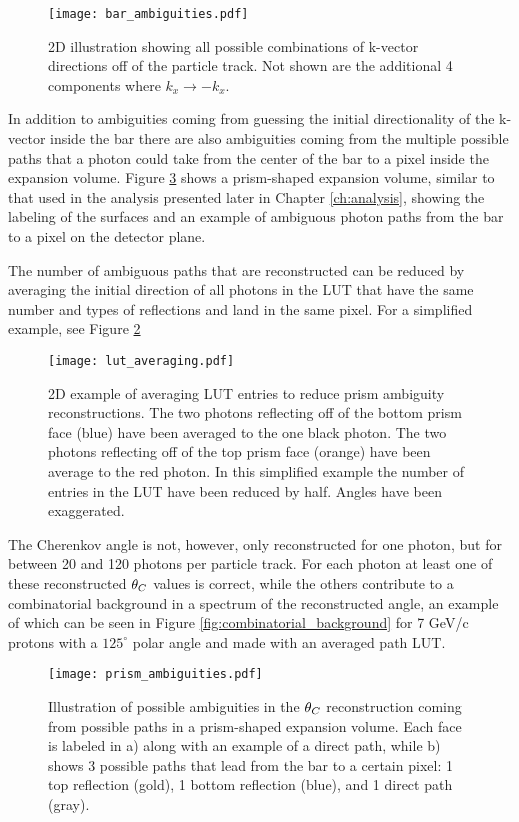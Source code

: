 \begin{figure}[!htb]
	\centering
	\texttt{[image: bar\_ambiguities.pdf]}
	\caption{2D illustration showing all possible combinations of k-vector directions off of the particle track. Not shown are the additional 4 components where $k_x \rightarrow -k_x$.}
	\label{fig:bar_ambiguities}
\end{figure}

In addition to ambiguities coming from guessing the initial directionality of the k-vector inside the bar there are also ambiguities coming from the multiple possible paths that a photon could take from the center of the bar to a pixel inside the expansion volume. Figure \ref{fig:prism_ambiguities} shows a prism-shaped expansion volume, similar to that used in the analysis presented later in Chapter \ref{ch:analysis}, showing the labeling of the surfaces and an example of ambiguous photon paths from the bar to a pixel on the detector plane.

The number of ambiguous paths that are reconstructed can be reduced by averaging the initial direction of all photons in the LUT that have the same number and types of reflections and land in the same pixel. For a simplified example, see Figure \ref{fig:lut_averaging}

\begin{figure}[!htb]
	\centering
	\texttt{[image: lut\_averaging.pdf]}
	\caption{2D example of averaging LUT entries to reduce prism ambiguity reconstructions. The two photons reflecting off of the bottom prism face (blue) have been averaged to the one black photon. The two photons reflecting off of the top prism face (orange) have been average to the red photon. In this simplified example the number of entries in the LUT have been reduced by half. Angles have been exaggerated.}
	\label{fig:lut_averaging}
\end{figure}

The Cherenkov angle is not, however, only reconstructed for one photon, but for between 20 and 120 photons per particle track. For each photon at least one of these reconstructed $\theta_{C}$ values is correct, while the others contribute to a combinatorial background in a spectrum of the reconstructed angle, an example of which can be seen in Figure \ref{fig:combinatorial_background} for 7 GeV/c protons with a $125^{\circ}$ polar angle and made with an averaged path LUT.

\begin{figure}[!htb]
	\centering
	\texttt{[image: prism\_ambiguities.pdf]}
	\caption{Illustration of possible ambiguities in the $\theta_{C}$ reconstruction coming from possible paths in a prism-shaped expansion volume. Each face is labeled in a) along with an example of a direct path, while b) shows 3 possible paths that lead from the bar to a certain pixel: 1 top reflection (gold), 1 bottom reflection (blue), and 1 direct path (gray).}
	\label{fig:prism_ambiguities}
\end{figure}

